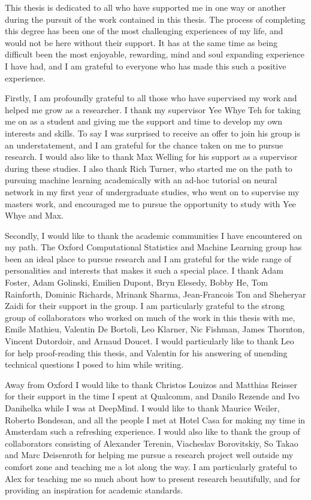 This thesis is dedicated to all who have supported me in one way or another during the pursuit of the work contained in this thesis.
The process of completing this degree has been one of the most challenging experiences of my life, and would not be here without their support.
It has at the same time as being difficult been the most enjoyable, rewarding, mind and soul expanding experience I have had, and I am grateful to everyone who has made this such a positive experience.

Firstly, I am profoundly grateful to all those who have supervised my work and helped me grow as a researcher.
I thank my supervisor Yee Whye Teh for taking me on as a student and giving me the support and time to develop my own interests and skills.
To say I was surprised to receive an offer to join his group is an understatement, and I am grateful for the chance taken on me to pursue research.
I would also like to thank Max Welling for his support as a supervisor during these studies.
I also thank Rich Turner, who started me on the path to pursuing machine learning academically with an ad-hoc tutorial on neural network in my first year of undergraduate studies, who went on to supervise my masters work, and encouraged me to pursue the opportunity to study with Yee Whye and Max.

Secondly, I would like to thank the academic communities I have encountered on my path. 
The Oxford Computational Statistics and Machine Learning group has been an ideal place to pursue research and I am grateful for the wide range of personalities and interests that makes it such a special place.
I thank Adam Foster, Adam Golinski, Emilien Dupont, Bryn Elesedy, Bobby He, Tom Rainforth, Dominic Richards, Mrinank Sharma, Jean-Francois Ton and Sheheryar Zaidi for their support in the group.
I am particularly grateful to the strong group of collaborators who worked on much of the work in this thesis with me, Emile Mathieu, Valentin De Bortoli, Leo Klarner, Nic Fishman, James Thornton, Vincent Dutordoir, and Arnaud Doucet.
I would particularly like to thank Leo for help proof-reading this thesis, and Valentin for his answering of unending technical questions I posed to him while writing.

Away from Oxford I would like to thank Christos Louizos and Matthias Reisser for their support in the time I spent at Qualcomm, and Danilo Rezende and Ivo Danihelka while I was at DeepMind.
I would like to thank Maurice Weiler, Roberto Bondesan, and all the people I met at Hotel Casa for making my time in Amsterdam such a refreshing experience.
I would also like to thank the group of collaborators consisting of Alexander Terenin, Viacheslav Borovitskiy, So Takao and Marc Deisenroth for helping me pursue a research project well outside my comfort zone and teaching me a lot along the way.
I am particularly grateful to Alex for teaching me so much about how to present research beautifully, and for providing an inspiration for academic standards.

